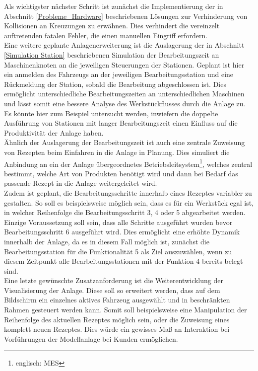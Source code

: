 	Als wichtigster nächster Schritt ist zunächst die Implementierung der in Abschnitt \ref{Probleme_Hardware} beschriebenen Lösungen zur Verhinderung von Kollisionen an Kreuzungen zu erwähnen. Dies verhindert die vereinzelt auftretenden fatalen Fehler, die einen manuellen Eingriff erfordern.\\
	Eine weitere  geplante Anlagenerweiterung ist die Auslagerung der in Abschnitt \ref{Simulation Station} beschriebenen Simulation der Bearbeitungszeit an Maschinenknoten an die jeweiligen Steuerungen der Stationen. Geplant ist hier ein anmelden des Fahrzeugs an der jeweiligen Bearbeitungsstation und eine Rückmeldung der Station, sobald die Bearbeitung abgeschlossen ist. Dies ermöglicht unterschiedliche Bearbeitungszeiten an unterschiedlichen Maschinen und lässt somit eine bessere Analyse des Werkstückflusses durch die Anlage zu. Es könnte hier zum Beispiel untersucht werden, inwiefern die doppelte Ausführung von Stationen mit langer Bearbeitungszeit einen Einfluss auf die Produktivität der Anlage haben.
	\\[4pt]
	Ähnlich der Auslagerung der Bearbeitungszeit ist auch eine zentrale Zuweisung von Rezepten beim Einfahren in die Anlage in Planung. Dies simuliert die Anbindung an ein der Anlage übergeordnetes Betriebsleitsystem\footnote{englisch: \ac{MES}}, welches zentral bestimmt, welche Art von Produkten benötigt wird und dann bei Bedarf das passende Rezept in die Anlage weitergeleitet wird.
	\\[4pt]
	Zudem ist geplant, die Bearbeitungsschritte innerhalb eines Rezeptes variabler zu gestalten. So soll es beispielsweise möglich sein, dass es für ein Werkstück egal ist, in welcher Reihenfolge die  Bearbeitungsschritt 3, 4 oder 5 abgearbeitet werden. Einzige Voraussetzung soll sein, dass alle Schritte ausgeführt wurden bevor Bearbeitungsschritt 6 ausgeführt wird. Dies ermöglicht eine erhöhte Dynamik innerhalb der Anlage, da es in diesem Fall möglich ist, zunächst die Bearbeitungsstation für die Funktionalität 5 als Ziel auszuwählen, wenn zu diesem Zeitpunkt alle Bearbeitungsstationen mit der Funktion 4 bereits belegt sind.
	\\[4pt]
	Eine letzte gewünschte Zusatzanforderung ist die Weiterentwicklung der Visualisierung der Anlage. Diese soll so erweitert werden, dass auf dem Bildschirm ein einzelnes aktives Fahrzeug ausgewählt und in beschränkten Rahmen gesteuert werden kann. Somit soll beispielsweise eine Manipulation der Reihenfolge des aktuellen Rezeptes möglich sein, oder die Zuweisung eines komplett neuen Rezeptes. Dies würde ein gewisses Maß an Interaktion bei Vorführungen der Modellanlage bei Kunden ermöglichen.

